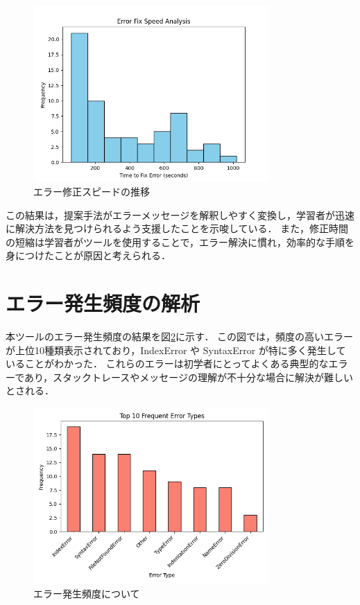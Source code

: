 \documentclass[12pt,twoside]{jbook}
\begin{document}
\begin{figure}[h]
  \centering
  \includegraphics[width=0.8\textwidth]{images/fix_speed_analysis.png}
  \caption{エラー修正スピードの推移}
  \label{fig:fix}
\end{figure}

この結果は，提案手法がエラーメッセージを解釈しやすく変換し，学習者が迅速に解決方法を見つけられるよう支援したことを示唆している．
また，修正時間の短縮は学習者がツールを使用することで，エラー解決に慣れ，効率的な手順を身につけたことが原因と考えられる．

\section{エラー発生頻度の解析}
本ツールのエラー発生頻度の結果を図\ref{fig:frequency}に示す．
この図では，頻度の高いエラーが上位10種類表示されており，IndexError や SyntaxError が特に多く発生していることがわかった．
これらのエラーは初学者にとってよくある典型的なエラーであり，スタックトレースやメッセージの理解が不十分な場合に解決が難しいとされる．

\begin{figure}[h]
  \centering
  \includegraphics[width=0.8\textwidth]{images/frequency_analysis.png}
  \caption{エラー発生頻度について}
  \label{fig:frequency}
\end{figure}
\end{document}

